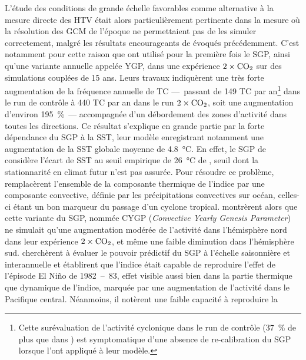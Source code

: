 \documentclass[../main.tex]{subfiles}
\begin{document}
L'étude des conditions de grande échelle favorables comme alternative à la mesure directe des HTV était alors particulièrement pertinente dans la mesure où la
résolution des GCM de l'époque ne permettaient pas de les simuler correctement, malgré les résultats encourageants de \textcite{broccoli_can_1990} évoqués
précédemment. C'est notamment pour cette raison que \hbox{\textcite{ryan_tropical_1992}} ont utilisé pour la première fois le SGP, ainsi qu'une variante
annuelle appelée YGP, dans une expérience \ensuremath{2\times\ce{CO2}} sur des simulations couplées de \num{15} ans. Leurs travaux indiquèrent une très forte
augmentation de la fréquence annuelle de TC ---~passant de \num{149} TC par an\footnote{Cette surévaluation de l'activité cyclonique dans le run de contrôle
    (\SI{37}{\percent} de plus que dans \cite{gray_tropical_1975}) est symptomatique d'une absence de re-calibration du SGP lorsque
\textcite{ryan_tropical_1992} l'ont appliqué à leur modèle.} dans le run de contrôle à \num{440} TC par an dans le run \ensuremath{2\times\ce{CO2}}, soit une
augmentation d'environ \SI{195}{\percent}~--- accompagnée d'un débordement des zones d'activité dans toutes les directions. Ce résultat s'explique en grande
partie par la forte dépendance du SGP à la SST, leur modèle enregistrant notamment une augmentation de la SST globale moyenne de \SI{4.8}{\degreeCelsius}. En
effet, le SGP de \citeauthor{gray_tropical_1975} considère l'écart de SST au seuil empirique de \SI{26}{\degreeCelsius} de \textcite{palmen_formation_1948},
seuil dont la stationnarité en climat futur n'est pas assurée. Pour résoudre ce problème, \textcite{royer_gcm_1998} remplacèrent l'ensemble de la composante
thermique de l'indice par une composante convective, définie par les précipitations convectives sur océan, celles-ci étant un bon marqueur du passage d'un
cyclone tropical. \textcite{royer_gcm_1998} montrèrent alors que cette variante du SGP, nommée CYGP (\textit{Convective Yearly Genesis Parameter}) ne simulait
qu'une augmentation modérée de l'activité dans l'hémisphère nord dans leur expérience \ensuremath{2\times\ce{CO2}}, et même une faible diminution dans
l'hémisphère sud. \mbox{\textcite{watterson_seasonal_1995}} cherchèrent à évaluer le pouvoir prédictif du SGP à l'échelle saisonnière et interannuelle et
établirent que l'indice était capable de reproduire l'effet de l'épisode El Niño de \num{1982}~--~\num{83}, effet visible  aussi bien dans la partie thermique
que dynamique de l'indice, marquée par une augmentation de l'activité dans le Pacifique central. Néanmoins, il notèrent une faible capacité à reproduire la
\end{document}
